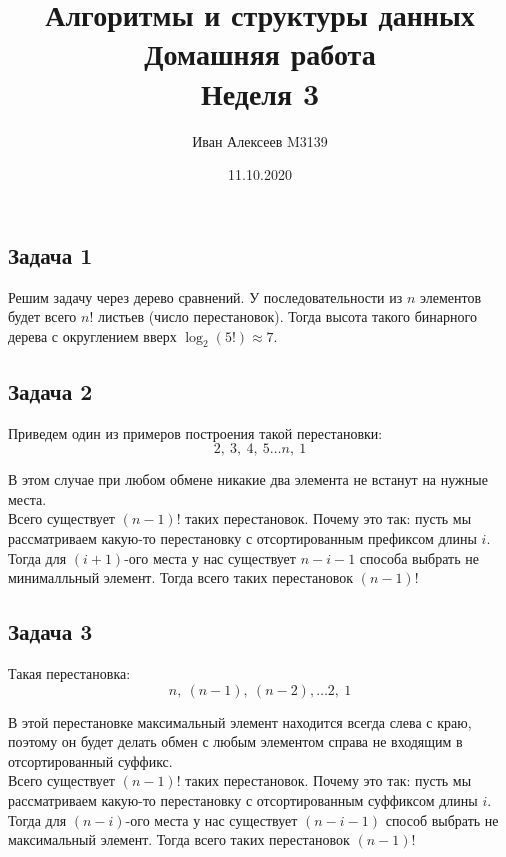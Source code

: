 \documentclass{article}
\title{Алгоритмы и структуры данных\\Домашняя работа\\Неделя 3}
\date{11.10.2020}
\author{Иван Алексеев M3139}
\begin{document}
	\maketitle %
	\subsection*{Задача 1}
	
	Решим задачу через дерево сравнений. У последовательности из $n$ элементов
	будет всего $n!$ листьев (число перестановок). Тогда высота такого бинарного дерева с округлением вверх $\log_2(5!) \approx 7$. 	
	\subsection*{Задача 2}
	
	Приведем один из примеров построения такой перестановки: \\
	$$2, \ 3, \ 4, \ 5 \dots n, \ 1$$
	
	
	В этом случае при любом обмене никакие два элемента не встанут на нужные места. \\
	
	Всего существует $(n - 1)!$ таких перестановок. Почему это так: 
	пусть мы рассматриваем какую-то перестановку с отсортированным префиксом длины $i$. Тогда для $(i + 1)$-ого места у нас существует $ n - i - 1$ способа выбрать не минималльный элемент. Тогда всего таких перестановок $(n - 1)!$
	
	
	\subsection*{Задача 3}
	
	Такая перестановка: \\
	$$n, \ (n - 1), \ (n - 2), \dots 2, \ 1$$
	
	
	
	В этой перестановке максимальный элемент находится всегда слева с краю, поэтому он будет делать обмен с любым элементом справа не входящим в отсортированный суффикс.  \\
	
	Всего существует $(n - 1)!$ таких перестановок. Почему это так: 
	пусть мы рассматриваем какую-то перестановку с отсортированным суффиксом длины $i$. Тогда для $(n - i)$-ого места у нас существует $ (n - i - 1)$ способ выбрать не максимальный элемент. Тогда всего таких перестановок $(n - 1)!$
	
\end{document}
